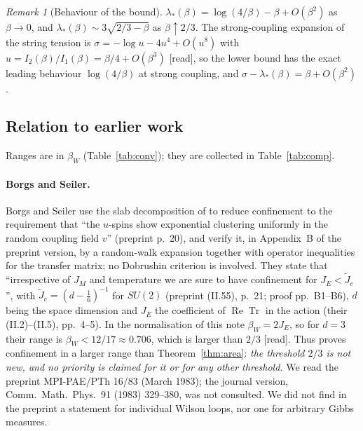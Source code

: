 \documentclass[11pt,a4paper]{article}
\theoremstyle{remark}
\theoremstyle{definition}
\theoremstyle{plain}
\theoremstyle{remark}
\newtheorem{alrem}[althm]{Remark}
\newcommand{\st}[1]{\textsf{[#1]}}
\begin{document}
\begin{alrem}[Behaviour of the bound]\label{rem:al-behaviour}
$\lambda_*(\beta)=\log(4/\beta)-\beta+O(\beta^2)$ as $\beta\to0$, and $\lambda_*(\beta)\sim3\sqrt{2/3-\beta}$ as $\beta\uparrow2/3$. The strong-coupling expansion of the string tension is $\sigma=-\log u-4u^4+O(u^8)$ with $u=I_2(\beta)/I_1(\beta)=\beta/4+O(\beta^3)$ \cite[Table~1]{DZ81} \st{read}, so the lower bound has the exact leading behaviour $\log(4/\beta)$ at strong coupling, and $\sigma-\lambda_*(\beta)=\beta+O(\beta^2)$.
\end{alrem}

\subsection{Relation to earlier work}\label{sec:areaprior}

Ranges are in $\beta_W$ (Table~\ref{tab:conv}); they are collected in Table~\ref{tab:comp}.

\paragraph{Borgs and Seiler.} Borgs and Seiler \cite{BS83} use the slab decomposition of \cite{DF80} to reduce confinement to the requirement that ``the $u$-spins show exponential clustering uniformly in the random coupling field $v$'' (preprint p.~20), and verify it, in Appendix~B of the preprint version, by a random-walk expansion together with operator inequalities for the transfer matrix; no Dobrushin criterion is involved. They state that ``irrespective of $J_M$ and temperature we are sure to have confinement for $J_E<\tilde J_c$'', with $\tilde J_c=(d-\frac16)^{-1}$ for $SU(2)$ (preprint (II.55), p.~21; proof pp.~B1--B6), $d$ being the space dimension and $J_E$ the coefficient of $\operatorname{Re}\operatorname{Tr}$ in the action (their (II.2)--(II.5), pp.~4--5). In the normalisation of this note $\beta_W=2J_E$, so for $d=3$ their range is $\beta_W<12/17\approx0.706$, which is larger than $2/3$ \st{read}. Thus \cite[Appendix~B of the preprint version]{BS83} proves confinement in a larger range than Theorem~\ref{thm:area}: \emph{the threshold $2/3$ is not new, and no priority is claimed for it or for any other threshold.} We read the preprint MPI-PAE/PTh 16/83 (March 1983); the journal version, Comm.\ Math.\ Phys.\ 91 (1983) 329--380, was not consulted. We did not find in the preprint a statement for individual Wilson loops, nor one for arbitrary Gibbs measures.
\end{document}
